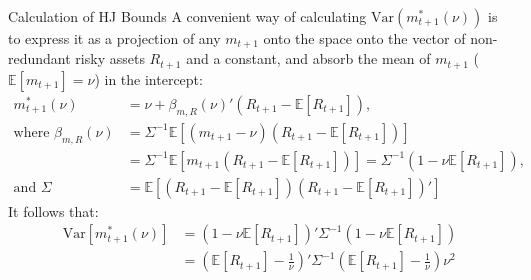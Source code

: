 \documentclass[xcolor=table, aspectratio=169]{beamer}
\newcommand{\E}{\mathbb{E}}
\begin{document}
\begin{frame}{Calculation of HJ Bounds}
    A convenient way of calculating $\text{Var}(m^*_{t+1} (\nu))$ is to express it as a projection of any $m_{t+1}$ onto the space onto the vector of non-redundant risky assets ${R}_{t+1}$ and a constant, and absorb the mean of $m_{t+1}$ ($\E[m_{t+1}] = \nu$) in the intercept:
\begin{align*}
m^*_{t+1} (\nu) &= \nu + \beta_{m,R}(\nu)'(R_{t+1} - \E[R_{t+1}]), \\
\text{where } \beta_{m,R}(\nu) &= \Sigma^{-1} \E[(m_{t+1}-\nu)(R_{t+1}-\E[R_{t+1}])] \\
 &= \Sigma^{-1} \E[m_{t+1}(R_{t+1}-\E[R_{t+1}])] = \Sigma^{-1} (1 - \nu \E[R_{t+1}]), \\
 \text{and } \Sigma &= \E[(R_{t+1}-\E[R_{t+1}])(R_{t+1}-\E[R_{t+1}])']
\end{align*}
It follows that:
\begin{align*}
        \text{Var}[m^*_{t+1}(\nu)] &= (1 - \nu \E[R_{t+1}])' \Sigma^{-1}(1 - \nu \E[R_{t+1}]) \\
        &= \left( \E[R_{t+1}] - \frac{1}{\nu} \right)' \Sigma^{-1} \left( \E[R_{t+1}] - \frac{1}{\nu} \right) \nu^2  \\
\end{align*}

\end{frame}






 

\end{document}
